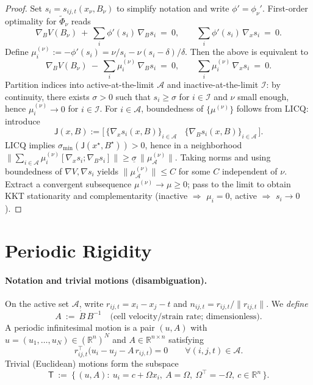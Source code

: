 \documentclass[11pt]{article}
\theoremstyle{remark}
\theoremstyle{definition}
\newcommand{\R}{\mathbb{R}}
\newcommand{\Triv}{\mathsf{T}}                 %
\begin{document}
\begin{proof}
Set $s_i=s_{ij,t}(x_\nu,B_\nu)$ to simplify notation and write $\phi'=\phi_\nu'$. First-order optimality for $\widetilde{\Phi}_\nu$ reads
\[
\nabla_B V(B_\nu)\ +\ \sum_i \phi'(s_i)\,\nabla_B s_i\ =\ 0,\qquad
\sum_i \phi'(s_i)\,\nabla_x s_i\ =\ 0.
\]
Define $\mu_i^{(\nu)}:=-\phi'(s_i)=\nu/s_i - \nu(s_i-\delta)/\delta$. Then the above is equivalent to
\[
\nabla_B V(B_\nu)\ -\ \sum_i \mu_i^{(\nu)}\,\nabla_B s_i\ =\ 0,\qquad
\sum_i \mu_i^{(\nu)}\,\nabla_x s_i\ =\ 0.
\]
Partition indices into active-at-the-limit $\mathcal{A}$ and inactive-at-the-limit $\mathcal{I}$: by continuity, there exists $\sigma>0$ such that $s_i\ge \sigma$ for $i\in\mathcal{I}$ and $\nu$ small enough, hence $\mu_i^{(\nu)}\to 0$ for $i\in\mathcal{I}$. For $i\in\mathcal{A}$, boundedness of $\{\mu^{(\nu)}\}$ follows from LICQ: introduce
\[
\mathsf{J}(x,B):=\bigl[\, \{\nabla_x s_i(x,B)\}_{i\in\mathcal{A}}\ \ \ \ \{\nabla_B s_i(x,B)\}_{i\in\mathcal{A}} \,\bigr].
\]
LICQ implies $\sigma_{\min}(\mathsf{J}(x^\star,B^\star))>0$, hence in a neighborhood $\|\sum_{i\in\mathcal{A}} \mu_i^{(\nu)}[\nabla_x s_i;\nabla_B s_i]\|\ge \underline{\sigma}\,\|\mu_{\mathcal{A}}^{(\nu)}\|$. Taking norms and using boundedness of $\nabla V,\nabla s_i$ yields $\|\mu_{\mathcal{A}}^{(\nu)}\|\le C$ for some $C$ independent of $\nu$. Extract a convergent subsequence $\mu^{(\nu)}\to\mu\ge 0$; pass to the limit to obtain KKT stationarity and complementarity (inactive $\Rightarrow$ $\mu_i=0$, active $\Rightarrow$ $s_i\to 0$). 
\end{proof}

\section{Periodic Rigidity}\label{sec:rigidity}
\paragraph{Notation and trivial motions (disambiguation).}
On the active set $\mathcal{A}$, write $r_{ij,t}=x_i-x_j-t$ and $n_{ij,t}=r_{ij,t}/\|r_{ij,t}\|$.
We \emph{define}
\[
A \ :=\ \dot B\,B^{-1}\quad\text{(cell velocity/strain rate; dimensionless)}.
\]
A periodic infinitesimal motion is a pair $(u,A)$ with $u=(u_1,\dots,u_N)\in(\R^n)^N$ and $A\in\R^{n\times n}$ satisfying
\begin{equation}\label{eq:inf}
r_{ij,t}^\top\bigl(u_i-u_j- A\,r_{ij,t}\bigr)=0\qquad \forall (i,j,t)\in\mathcal{A}.
\end{equation}
Trivial (Euclidean) motions form the subspace
\[
\Triv \ :=\ \bigl\{\, (u,A):\ u_i=c+\Omega x_i,\ A=\Omega,\ \Omega^\top=-\Omega,\ c\in\R^n \,\bigr\}.
\]
\end{document}
